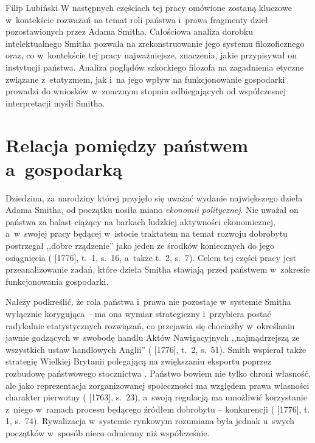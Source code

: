 \begin{artplenv}{Filip Lubiński}
W następnych częściach tej pracy omówione zostaną kluczowe w~kontekście rozważań na temat roli państwa i~prawa
fragmenty dzieł pozostawionych przez Adama Smitha. Całościowa analiza dorobku intelektualnego Smitha pozwala na
zrekonstruowanie jego systemu filozoficznego oraz, co w~kontekście tej pracy najważniejsze, znaczenia, jakie przypisywał
on instytucji państwa. Analiza poglądów szkockiego filozofa na zagadnienia etyczne związane z~etatyzmem, jak i~na jego
wpływ na funkcjonowanie gospodarki prowadzi do wniosków w~znacznym stopniu odbiegających od współczesnej interpretacji
myśli Smitha.

\section{Relacja pomiędzy państwem a~gospodarką}
Dziedzina, za narodziny której przyjęło się uważać wydanie największego dzieła Adama Smitha, od początku nosiła miano
\textit{ekonomii} \textit{politycznej}. Nie uważał on państwa za balast ciążący na barkach ludzkiej aktywności
ekonomicznej, a~w~swojej pracy będącej w~istocie traktatem na temat rozwoju dobrobytu postrzegał ,,dobre rządzenie'' jako
jeden ze środków koniecznych do jego osiągnięcia
(\cite{smith_badania_2007} [1776], t.~1, s.~16, a~także t.~2, s.~7).
Celem tej części pracy jest przeanalizowanie zadań, które dzieła Smitha stawiają przed państwem w~zakresie
funkcjonowania gospodarki.

Należy podkreślić, że rola państwa i~prawa nie pozostaje w~systemie Smitha wyłącznie korygująca -- ma ona wymiar
strategiczny i~przybiera postać radykalnie etatystycznych rozwiązań, co przejawia się chociażby w~określaniu jawnie
godzących w~swobodę handlu Aktów Nawigacyjnych ,,najmądrzejszą ze wszystkich ustaw handlowych Anglii''
(\cite{smith_badania_2007} [1776], t.~2, s.~51).
Smith wspierał także strategię Wielkiej Brytanii polegającą
na zwiększaniu eksportu poprzez rozbudowę państwowego stocznictwa
\parencite[s.~185–186]{beattie_false_2010}.
Państwo bowiem nie tylko chroni własność, ale jako reprezentacja zorganizowanej społeczności ma względem prawa
własności charakter pierwotny
(\cite{smith_lectures_1982} [1763], s.~23),
a~swoją regulacją ma umożliwić
korzystanie z~niego w~ramach procesu będącego źródłem dobrobytu -- konkurencji
(\cite{smith_badania_2007} [1776], t. 1, s.~74).
Rywalizacja w~systemie rynkowym rozumiana była jednak u~swych początków w~sposób nieco odmienny
niż współcześnie.


\end{artplenv}
